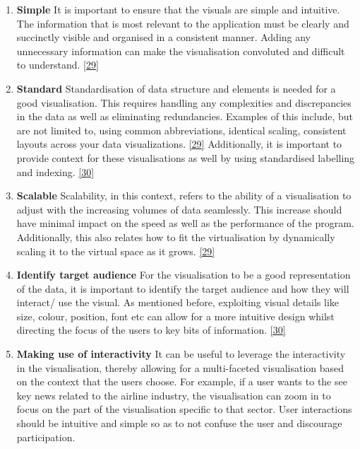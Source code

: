\begin{enumerate}
\item \textbf{Simple}
It is important to ensure that the visuals are simple and intuitive. The information that is most relevant to the application must be clearly and succinctly visible and organised in a consistent manner. Adding any unnecessary information can make the visualisation convoluted and difficult to understand. \hyperlink{29}{[29]}

\item \textbf{Standard}
Standardisation of data structure and elements is needed for a good visualisation. This requires handling any complexities and discrepancies in the data as well as eliminating redundancies. Examples of this include, but are not limited to, using common abbreviations, identical scaling, consistent layouts across your data visualizations. \hyperlink{29}{[29]} Additionally, it is important to provide context for these visualisations as well by using standardised labelling and indexing. \hyperlink{30}{[30]}

\item \textbf{Scalable}
Scalability, in this context, refers to the ability of a visualisation to adjust with the increasing volumes of data seamlessly. This increase should have minimal impact on the speed as well as the performance of the program. Additionally, this also relates how to fit the virtualisation by dynamically scaling it to the virtual space as it grows. \hyperlink{29}{[29]}

\item \textbf{Identify target audience}
 For the visualisation to be a good representation of the data, it is important to identify the target audience and how they will interact/ use the visual. As mentioned before, exploiting visual details like size, colour, position, font etc can allow for a more intuitive design whilst directing the focus of the users to key bits of information. \hyperlink{30}{[30]}

\item \textbf{Making use of interactivity}
It can be useful to leverage the interactivity in the visualisation, thereby allowing for a multi-faceted visualisation based on the context that the users choose. For example, if a user wants to the see key news related to the airline industry, the visualisation can zoom in to focus on the part of the visualisation specific to that sector. User interactions should be intuitive and simple so as to not confuse the user and discourage participation. 

\end{enumerate}



